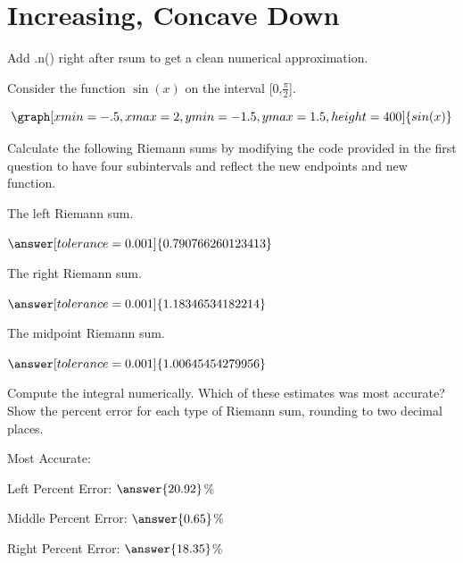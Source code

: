 \documentclass{ximera}
\begin{document}
\section{Increasing, Concave Down}
\begin{question}
\begin{hint}
Add .n() right after rsum to get a clean numerical approximation.
\end{hint}
Consider the function $\sin(x)$ on the interval [0,$\frac{\pi}{2}$].

\[
\graph[xmin=-.5,xmax=2,ymin=-1.5,ymax=1.5,height=400]{sin(x)}
\]

Calculate the following Riemann sums by modifying the code provided in the first question to have four subintervals and reflect the new endpoints and new function.

The left Riemann sum.

\begin{onlineOnly}
\begin{sageCell}

\end{sageCell}
\end{onlineOnly}

$\answer[tolerance=0.001]{0.790766260123413}$

The right Riemann sum.

\begin{onlineOnly}
\begin{sageCell}

\end{sageCell}
\end{onlineOnly}

$\answer[tolerance=0.001]{1.18346534182214}$

The midpoint Riemann sum.

\begin{onlineOnly}
\begin{sageCell}

\end{sageCell}
\end{onlineOnly}

$\answer[tolerance=0.001]{1.00645454279956}$

Compute the integral numerically. Which of these estimates was most accurate? Show the percent error for each type of Riemann sum, rounding to two decimal places.

\begin{onlineOnly}
\begin{sageCell}

\end{sageCell}
\end{onlineOnly}

Most Accurate:
\begin{multipleChoice}
\end{multipleChoice}

Left Percent Error: $\answer{20.92}$\%

Middle Percent Error: $\answer{0.65}$\%

Right Percent Error: $\answer{18.35}$\%
\end{question}
\end{document}
